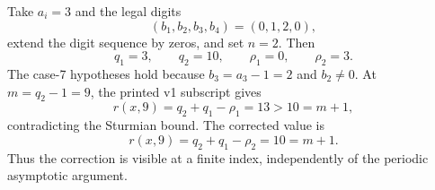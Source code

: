 \begin{example}
\label{ex:case7-certificate}
Take $a_i=3$ and the legal digits
\[
 (b_1,b_2,b_3,b_4)=(0,1,2,0),
\]
extend the digit sequence by zeros, and set $n=2$.  Then
\[
 q_1=3,\qquad q_2=10,\qquad \rho_1=0,\qquad \rho_2=3.
\]
The case-7 hypotheses hold because $b_3=a_3-1=2$ and $b_2\ne0$.
At $m=q_2-1=9$, the printed v1 subscript gives
\[
 r(x,9)=q_2+q_1-\rho_1=13>10=m+1,
\]
contradicting the Sturmian bound.  The corrected value is
\[
 r(x,9)=q_2+q_1-\rho_2=10=m+1.
\]
Thus the correction is visible at a finite index, independently of the
periodic asymptotic argument.
\end{example}
